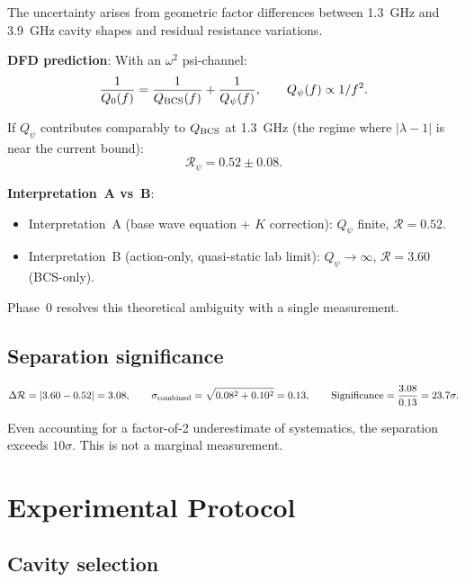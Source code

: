 \documentclass[11pt]{article}
\newcommand{\Qpsi}{Q_\psi}
\newcommand{\lbone}{|\lambda - 1|}
\theoremstyle{definition}
\theoremstyle{remark}
\begin{document}
The uncertainty arises from geometric factor differences between
1.3~GHz and 3.9~GHz cavity shapes and residual resistance variations.

\textbf{DFD prediction}: With an $\omega^2$ psi-channel:
\begin{equation}
\frac{1}{Q_0(f)} = \frac{1}{Q_{\rm BCS}(f)} + \frac{1}{Q_\psi(f)},
\qquad Q_\psi(f) \propto 1/f^2.
\end{equation}

If $Q_\psi$ contributes comparably to $Q_{\rm BCS}$ at 1.3~GHz
(the regime where $\lbone$ is near the current bound):
\begin{equation}
\mathcal{R}_\psi = 0.52 \pm 0.08.
\end{equation}

\textbf{Interpretation~A vs~B}:
\begin{itemize}[nosep]
\item Interpretation~A (base wave equation + $K$ correction):
  $\Qpsi$ finite, $\mathcal{R} = 0.52$.
\item Interpretation~B (action-only, quasi-static lab limit):
  $\Qpsi \to \infty$, $\mathcal{R} = 3.60$ (BCS-only).
\end{itemize}

Phase~0 resolves this theoretical ambiguity with a single measurement.

\subsection{Separation significance}

\begin{equation}
\Delta\mathcal{R} = |3.60 - 0.52| = 3.08, \qquad
\sigma_{\rm combined} = \sqrt{0.08^2 + 0.10^2} = 0.13, \qquad
\text{Significance} = \frac{3.08}{0.13} = 23.7\sigma.
\end{equation}

Even accounting for a factor-of-2 underestimate of systematics,
the separation exceeds $10\sigma$. This is not a marginal measurement.


\section{Experimental Protocol}

\subsection{Cavity selection}
\end{document}

